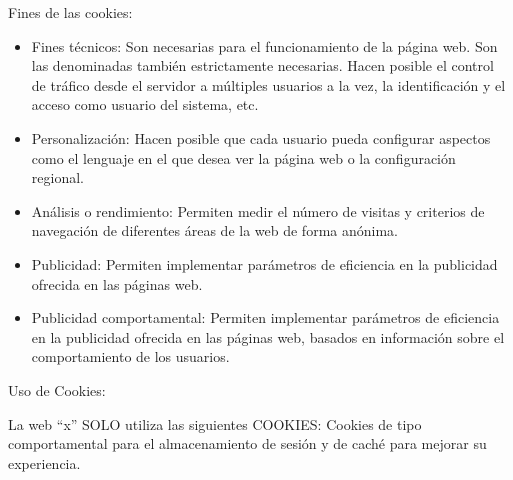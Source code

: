 \documentclass[
  a4paper,
  openany]{book}
\begin{document}
Fines de las cookies:

\begin{itemize}
\item
  Fines técnicos: Son necesarias para el funcionamiento de la página web. Son las denominadas también estrictamente necesarias. Hacen posible el control de tráfico desde el servidor a múltiples usuarios a la vez, la identificación y el acceso como usuario del sistema, etc.
\item
  Personalización: Hacen posible que cada usuario pueda configurar aspectos como el lenguaje en el que desea ver la página web o la configuración regional.
\item
  Análisis o rendimiento: Permiten medir el número de visitas y criterios de navegación de diferentes áreas de la web de forma anónima.
\item
  Publicidad: Permiten implementar parámetros de eficiencia en la publicidad ofrecida en las páginas web.
\item
  Publicidad comportamental: Permiten implementar parámetros de eficiencia en la publicidad ofrecida en las páginas web, basados en información sobre el comportamiento de los usuarios.
\end{itemize}

Uso de Cookies:

La web ``x'' SOLO utiliza las siguientes COOKIES: Cookies de tipo comportamental para el almacenamiento de sesión y de caché para mejorar su experiencia.
\end{document}
